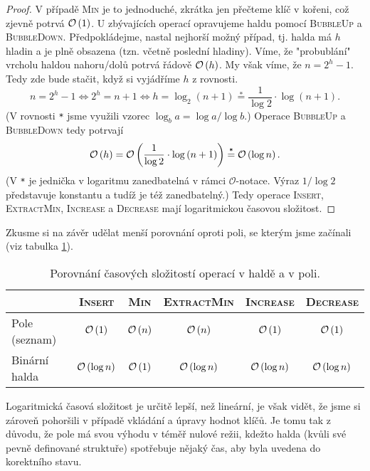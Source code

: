 \begin{proof}
    V případě \textsc{Min} je to jednoduché, zkrátka jen přečteme klíč v kořeni, což zjevně potrvá $\mathcal{O}\left(1\right)$. U zbývajících operací opravujeme haldu pomocí \textsc{BubbleUp} a \textsc{BubbleDown}. Předpokládejme, nastal nejhorší možný případ, tj. halda má $h$ hladin a je plně obsazena (tzn. včetně poslední hladiny). Víme, že "probublání" vrcholu haldou nahoru/dolů potrvá řádově $\mathcal{O}\left(h\right)$. My však víme, že $n=2^h-1$. Tedy zde bude stačit, když si vyjádříme $h$ z rovnosti.
    \[n=2^h-1 \iff 2^h=n+1 \iff h=\log_2{(n+1)}\stackrel{\texttt{*}}{=}\dfrac{1}{\log{2}}\cdot\log{(n+1)}.\]
    (V rovnosti \texttt{*} jsme využili vzorec $\log_b{a}=\log{a}/\log{b}$.) Operace \textsc{BubbleUp} a \textsc{BubbleDown} tedy potrvají
    \[\mathcal{O}\left(h\right)=\mathcal{O}\left(\dfrac{1}{\log{2}}\cdot\log{(n+1)}\right)\stackrel{\texttt{*}}{=}\mathcal{O}\left(\log{n}\right).\]
    (V \texttt{*} je jednička v logaritmu zanedbatelná v rámci $\mathcal{O}$-notace. Výraz $1/\log{2}$ představuje konstantu a tudíž je též zanedbatelný.) Tedy operace \textsc{Insert}, \textsc{ExtractMin}, \textsc{Increase} a \textsc{Decrease} mají logaritmickou časovou složitost.
\end{proof}
Zkusme si na závěr udělat menší porovnání oproti poli, se kterým jsme začínali (viz tabulka \ref{tab:halda_pole_operace}).
\begin{table}[h]
    \centering
    \begin{tabular}{l|ccccc}
                  & \textsc{Insert} & \textsc{Min} & \textsc{ExtractMin} & \textsc{Increase} & \textsc{Decrease} \\\hline
    Pole (seznam) & $\mathcal{O}\left(1\right)$                       & $\mathcal{O}\left(n\right)$                    & $\mathcal{O}\left(n\right)$                           & $\mathcal{O}\left(1\right)$                         & $\mathcal{O}\left(1\right)$                         \\
    Binární halda & $\mathcal{O}\left(\log{n}\right)$                 & $\mathcal{O}\left(1\right)$                    & $\mathcal{O}\left(\log{n}\right)$                     & $\mathcal{O}\left(\log{n}\right)$                   & $\mathcal{O}\left(\log{n}\right)$                  
    \end{tabular}
    \caption{Porovnání časových složitostí operací v haldě a v poli.}
    \label{tab:halda_pole_operace}
\end{table}
Logaritmická časová složitost je určitě lepší, než lineární, je však vidět, že jsme si zároveň pohoršili v případě vkládání a úpravy hodnot klíčů. Je tomu tak z důvodu, že pole má svou výhodu v téměř nulové režii, kdežto halda (kvůli své pevně definované struktuře) spotřebuje nějaký čas, aby byla uvedena do korektního stavu.